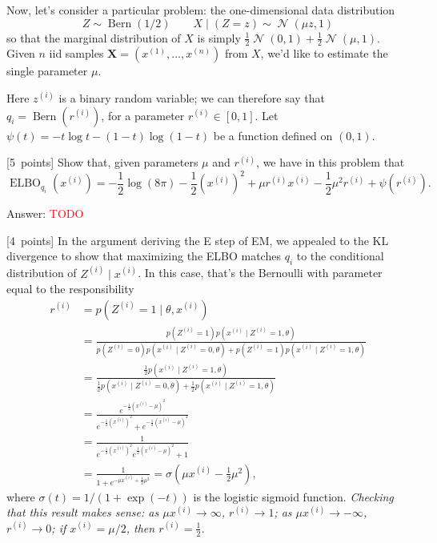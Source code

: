 \documentclass{article}
\newcommand{\ask}[1]{\textcolor{question}{#1}}
\newenvironment{answer}{\par\begingroup\color{answer}Answer: }{\endgroup}
\newcommand{\red}[1]{\textcolor{red}{#1}}
\newcommand{\pts}[1]{\textcolor{points}{[#1~points]}}
\newcommand{\meta}[1]{\textcolor{black!60!white}{\emph{#1}}}
\newcommand{\TODO}{\red{TODO}}
\DeclareMathOperator{\Bern}{Bern}
\DeclareMathOperator{\ELBO}{ELBO}
\newcommand{\bX}{\mathbf{X}}
\DeclareMathOperator{\N}{\mathcal{N}}
\newcommand{\toth}[1]{^{(#1)}}
\newcommand{\ith}{\toth{i}}
\numberwithin{equation}{section}
\begin{document}
Now, let's consider a particular problem:
the one-dimensional data distribution
\[
    Z \sim \Bern(1/2)
    \qquad
    X \mid (Z = z) \sim \N(\mu z, 1)
\]
so that the marginal distribution of $X$ is simply
$\frac12 \N(0, 1) + \frac12 \N(\mu, 1)$.
Given $n$ iid samples $\bX = (x\toth{1}, \dots, x\toth{n})$ from $X$,
we'd like to estimate the single parameter $\mu$.

Here $z\ith$ is a binary random variable;
we can therefore say that $q_i = \Bern(r\ith)$,
for a parameter $r\ith \in [0, 1]$.
Let $\psi(t) = - t \log t - (1-t) \log(1-t)$ be a function defined on $(0, 1)$.

\begin{qlist}[resume]
\item \pts{5}
    \ask{Show that, given parameters $\mu$ and $r\ith$,
    we have in this problem that
    \begin{equation}
        \ELBO_{q_i}(x\ith)
        = -\frac12 \log(8\pi) - \frac12 \left(x\ith\right)^2 + \mu r\ith x\ith - \frac12 \mu^2 r\ith
        + \psi\left(r\ith\right)
    \label{eq:elbo-qi}
    .\end{equation}
    }
    \begin{answer}\TODO\end{answer}

    \item \pts{4}
    In the argument deriving the E step of EM,
    we appealed to the KL divergence to show that maximizing the ELBO matches $q_i$
    to the conditional distribution of $Z\ith \mid x\ith$.
    In this case, that's the Bernoulli with parameter equal to the responsibility
    \begin{align*}
        r\ith
     &= p(Z\ith = 1 \mid \theta, x\ith)
    \\&= \frac{p(Z\ith = 1) p(x\ith \mid Z\ith = 1, \theta)}{p(Z\ith = 0) p(x\ith \mid Z\ith = 0, \theta) + p(Z\ith = 1) p(x\ith \mid Z\ith = 1, \theta)}
    \\&= \frac{\frac12 p(x\ith \mid Z\ith = 1, \theta)}{\frac12 p(x\ith \mid Z\ith = 0, \theta) + \frac12 p(x\ith \mid Z\ith = 1, \theta)}
    \\&= \frac{e^{-\frac12 (x\ith - \mu)^2}}{e^{-\frac12 (x\ith)^2} + e^{-\frac12 (x\ith - \mu)^2}}
    \\&= \frac{1}{e^{-\frac12 (x\ith)^2} e^{\frac12 (x\ith - \mu)^2} + 1}
    \\&= \frac{1}{1 + e^{-\mu x\ith + \frac12 \mu^2}}
      = \sigma\left( \mu x\ith - \frac12 \mu^2 \right)
    ,\end{align*}
    where $\sigma(t) = 1 / (1 + \exp(-t))$ is the logistic sigmoid function.
    \meta{Checking that this result makes sense: as $\mu x\ith \to \infty$, $r\ith \to 1$; as $\mu x\ith \to -\infty$, $r\ith \to 0$; if $x\ith = \mu / 2$, then $r\ith = \frac12$.}


\end{qlist}
\end{document}
